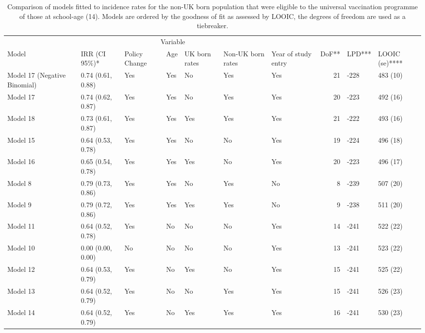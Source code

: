 \documentclass[11pt,twoside]{bristolthesis}
\begin{document}
  \begin{landscape}\begin{table}[!h]
  
  \caption[Comparison of models fitted to incidence rates for the non-UK born population that were eligible to the universal vaccination programme of those at school-age (14).]{\label{tab:07-summary-universal-nonukborn}Comparison of models fitted to incidence rates for the non-UK born population that were eligible to the universal vaccination programme of those at school-age (14). Models are ordered by the goodness of fit as assessed by LOOIC, the degrees of freedom are used as a tiebreaker.}
  \centering
  \fontsize{8}{10}\selectfont
  \begin{tabular}{>{\raggedright\arraybackslash}p{3cm}llllllrll}
  \toprule
  \multicolumn{2}{c}{ } & \multicolumn{5}{c}{Variable} & \multicolumn{3}{c}{ } \\
  \cmidrule(l{3pt}r{3pt}){3-7}
  Model & IRR (CI 95\%)* & Policy Change & Age & UK born rates & Non-UK born rates & Year of study entry & DoF** & LPD*** & LOOIC (se)****\\
  \midrule
  Model 17 (Negative Binomial) & 0.74 (0.61, 0.88) & Yes & Yes & No & Yes & Yes & 21 & -228 & 483 (10)\\
  Model 17 & 0.74 (0.62, 0.87) & Yes & Yes & No & Yes & Yes & 20 & -223 & 492 (16)\\
  Model 18 & 0.73 (0.61, 0.87) & Yes & Yes & Yes & Yes & Yes & 21 & -222 & 493 (16)\\
  Model 15 & 0.64 (0.53, 0.78) & Yes & Yes & No & No & Yes & 19 & -224 & 496 (18)\\
  Model 16 & 0.65 (0.54, 0.78) & Yes & Yes & Yes & No & Yes & 20 & -223 & 496 (17)\\
  \addlinespace
  Model 8 & 0.79 (0.73, 0.86) & Yes & Yes & No & Yes & No & 8 & -239 & 507 (20)\\
  Model 9 & 0.79 (0.72, 0.86) & Yes & Yes & Yes & Yes & No & 9 & -238 & 511 (20)\\
  Model 11 & 0.64 (0.52, 0.78) & Yes & No & No & No & Yes & 14 & -241 & 522 (22)\\
  Model 10 & 0.00 (0.00, 0.00) & No & No & No & No & Yes & 13 & -241 & 523 (22)\\
  Model 12 & 0.64 (0.53, 0.79) & Yes & No & Yes & No & Yes & 15 & -241 & 525 (22)\\
  \addlinespace
  Model 13 & 0.64 (0.52, 0.79) & Yes & No & No & Yes & Yes & 15 & -241 & 526 (23)\\
  Model 14 & 0.64 (0.52, 0.79) & Yes & No & Yes & Yes & Yes & 16 & -241 & 530 (23)\\

\end{tabular}
\end{table}
\end{landscape}
\end{document}
